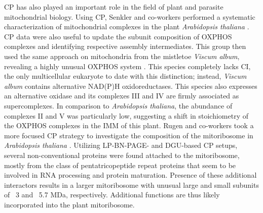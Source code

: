 CP has also played an important role in the field of plant and parasite mitochondrial biology. Using CP, Senkler and co-workers performed a systematic characterization of mitochondrial complexes in the plant \emph{Arabidopsis thaliana} \cite{Senkler_2017}. CP data were also useful to update the subunit composition of OXPHOS complexes and identifying respective assembly intermediates. This group then used the same approach on mitochondria from the mistletoe \emph{Viscum album}, revealing a highly unusual OXPHOS system \cite{Senkler_2018}. This species completely lacks CI, the only multicellular eukaryote to date with this distinction; instead, \emph{Viscum album} contains alternative NAD(P)H oxidoreductases. This species also expresses an alternative oxidase and its complexes III and IV are firmly associated as supercomplexes. In comparison to \emph{Arabidopsis thaliana}, the abundance of complexes II and V was particularly low, suggesting a shift in stoichiometry of the OXPHOS complexes in the IMM of this plant. Rugen and co-workers took a more focused CP strategy to investigate the composition of the mitoribosome in \emph{Arabidopsis thaliana} \cite{Rugen_2019}. Utilizing LP-BN-PAGE- and DGU-based CP setups, several non-conventional proteins were found attached to the mitoribosome, mostly from the class of pentatricopeptide repeat proteins that seem to be involved in RNA processing and protein maturation. Presence of these additional interactors results in a larger mitoribosome with unusual large and small subunits of ~3 and ~5.7 MDa, respectively. Additional functions are thus likely incorporated into the plant mitoribosome.\\
